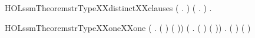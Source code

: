 \newcommand{\HOLssmTheoremsTRruleOne}{\UseVerbatim{HOLssmTheoremsTRruleOne}}
\begin{SaveVerbatim}{HOLssmTheoremstrTypeXXdistinctXXclauses}
\HOLTokenTurnstile{} (\HOLSymConst{\HOLTokenForall{}} .   \HOLSymConst{\HOLTokenNotEqual{}}  ) \HOLSymConst{\HOLTokenConj{}} (\HOLSymConst{\HOLTokenForall{}} .   \HOLSymConst{\HOLTokenNotEqual{}}  ) \HOLSymConst{\HOLTokenConj{}}
   \HOLSymConst{\HOLTokenForall{}} .   \HOLSymConst{\HOLTokenNotEqual{}}  
\end{SaveVerbatim}
\newcommand{\HOLssmTheoremstrTypeXXdistinctXXclauses}{\UseVerbatim{HOLssmTheoremstrTypeXXdistinctXXclauses}}


\begin{SaveVerbatim}{HOLssmTheoremstrTypeXXoneXXone}
\HOLTokenTurnstile{} (\HOLSymConst{\HOLTokenForall{}} . (  \HOLSymConst{=}  ) \HOLSymConst{\HOLTokenEquiv{}} ( \HOLSymConst{=} )) \HOLSymConst{\HOLTokenConj{}}
   (\HOLSymConst{\HOLTokenForall{}} . (  \HOLSymConst{=}  ) \HOLSymConst{\HOLTokenEquiv{}} ( \HOLSymConst{=} )) \HOLSymConst{\HOLTokenConj{}}
   \HOLSymConst{\HOLTokenForall{}} . (  \HOLSymConst{=}  ) \HOLSymConst{\HOLTokenEquiv{}} ( \HOLSymConst{=} )
\end{SaveVerbatim}



